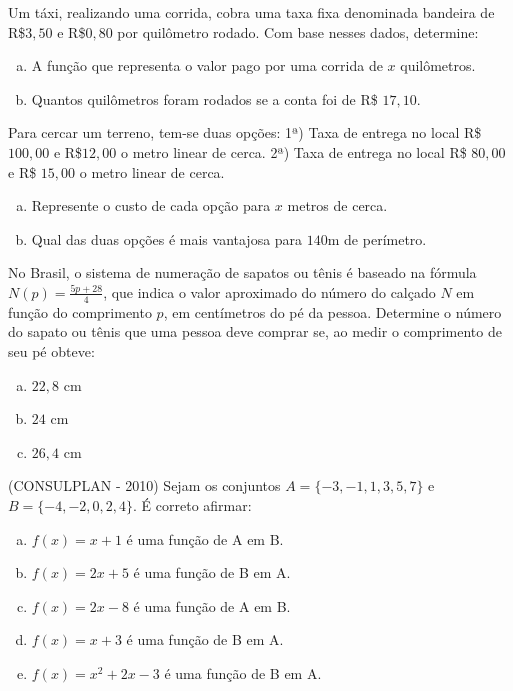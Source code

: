   \begin{exer}
  Um táxi, realizando uma corrida, cobra uma taxa fixa denominada bandeira de R\$$3,50$ e R\$$0,80$ por quilômetro rodado.
  Com base nesses dados, determine:
  \begin{enumerate}[a)]
  \item A função que representa o valor pago por uma corrida de $x$ quilômetros.
  \item Quantos quilômetros foram rodados se a conta foi de R\$ $17,10$.
  \end{enumerate}
  \end{exer}
  
  \begin{exer}
  Para cercar um terreno, tem-se duas opções:
  1ª) Taxa de entrega no local R\$ $100,00$ e R\$$12,00$ o metro linear de cerca.
  2ª) Taxa de entrega no local R\$ $80,00$ e R\$ $15,00$ o metro linear de cerca.
  \begin{enumerate}[a)]
  \item Represente o custo de cada opção para $x$ metros de cerca.
  \item Qual das duas opções é mais vantajosa para $140$m de perímetro.
  \end{enumerate}
  \end{exer}
  
  \begin{exer}
  No Brasil, o sistema de numeração de sapatos ou tênis é baseado na fórmula $N(p)= \frac{5p + 28}{4}$, que indica o valor aproximado do número do calçado $N$ em função do comprimento $p$, em centímetros do pé da pessoa. Determine o número do sapato ou tênis que uma pessoa deve comprar se, ao medir o comprimento de seu pé obteve:
  \begin{enumerate}[a)]
  \item $22,8$ cm
  \item $24$ cm
  \item $26,4$ cm
  \end{enumerate}
  \end{exer}
  
  \begin{exer}
  (CONSULPLAN - 2010) Sejam os conjuntos $A = \{- 3, - 1, 1, 3, 5, 7\}$ e $B = \{- 4, -2, 0, 2, 4\}$. É correto afirmar:
  \begin{enumerate}[a)]
  \item $f(x) = x + 1$ é uma função de A em B.
  \item $f(x) = 2x + 5$ é uma função de B em A.
  \item $f(x) = 2x - 8$ é uma função de A em B.
  \item $f(x) = x + 3$ é uma função de B em A.
  \item $f(x) = x^2 + 2x - 3$ é uma função de B em A.
 \end{enumerate}
  \end{exer}
  
